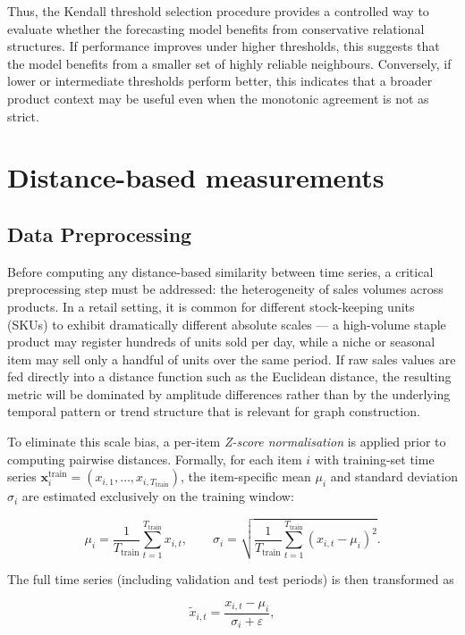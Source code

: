 Thus, the Kendall threshold selection procedure provides a controlled way to evaluate whether the forecasting model benefits from conservative relational structures. If performance improves under higher thresholds, this suggests that the model benefits from a smaller set of highly reliable neighbours. Conversely, if lower or intermediate thresholds perform better, this indicates that a broader product context may be useful even when the monotonic agreement is not as strict.
\section{Distance-based measurements}

\subsection{Data Preprocessing}

Before computing any distance-based similarity between time series, a critical preprocessing step must be addressed: the heterogeneity of sales volumes across products. In a retail setting, it is common for different stock-keeping units (SKUs) to exhibit dramatically different absolute scales — a high-volume staple product may register hundreds of units sold per day, while a niche or seasonal item may sell only a handful of units over the same period. If raw sales values are fed directly into a distance function such as the Euclidean distance, the resulting metric will be dominated by amplitude differences rather than by the underlying temporal pattern or trend structure that is relevant for graph construction.

To eliminate this scale bias, a per-item \textit{Z-score normalisation} is applied prior to computing pairwise distances. Formally, for each item $i$ with training-set time series $\mathbf{x}_i^{\text{train}} = (x_{i,1}, \ldots, x_{i,T_{\text{train}}})$, the item-specific mean $\mu_i$ and standard deviation $\sigma_i$ are estimated exclusively on the training window:

\begin{equation}
    \mu_i = \frac{1}{T_{\text{train}}} \sum_{t=1}^{T_{\text{train}}} x_{i,t}, \qquad
    \sigma_i = \sqrt{\frac{1}{T_{\text{train}}} \sum_{t=1}^{T_{\text{train}}} \left(x_{i,t} - \mu_i\right)^2}.
\end{equation}

The full time series (including validation and test periods) is then transformed as

\begin{equation}
    \tilde{x}_{i,t} = \frac{x_{i,t} - \mu_i}{\sigma_i + \varepsilon},
\end{equation}

